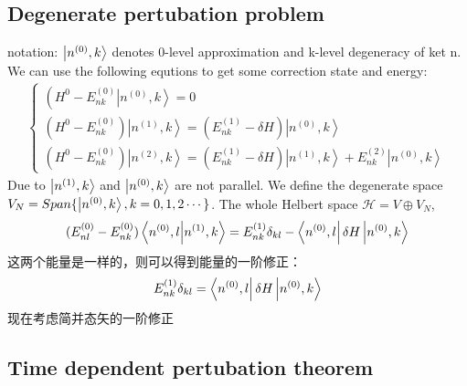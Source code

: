 \documentclass[UTF8]{article}
\numberwithin{equation}{section}
\begin{document}
\subsection{Degenerate pertubation problem}
notation: $\ket{n^{(0)},k}$ denotes 0-level approximation and k-level degeneracy of ket n.
We can use the following equtions to get some correction state and energy:
\begin{align*}
    \left\{\begin{array}{l}
    \left(H^0-E_{n k}^{(0)}\left|n^{(0)}, k\right\rangle=0 \right. \\
    \left(H^0-E_{n k}^{(0)}\right)\left|n^{(1)}, k\right\rangle=\left(E_{n k}^{(1)}-\delta H\right)\left|n^{(0)}, k\right\rangle \\
    \left(H^0-E_{n k}^{(0)}\right)\left|n^{(2)}, k\right\rangle=\left(E_{n k}^{(1)}-\delta H\right)\left|n^{(1)}, k\right\rangle+E_{n k}^{(2)}\left|n^{(0)}, k\right\rangle
    \end{array}\right.
\end{align*}
Due to $\ket{n^{(1)},k}$ and $\ket{n^{(0)},k}$ are not parallel. We define
the degenerate space $V_N = Span\{\ket{n^{(0)},k},k=0,1,2\cdots\}$. The
whole Helbert space $\mathcal{H} =V \oplus V_N$,
\begin{align*}
    (E_{nl}^{(0)}-E_{nk}^{(0)})\braket{n^{(0)},l}{n^{(1)},k} = E_{nk}^{(1)}
    \delta _{kl}-\bra{n^{(0)},l}\delta H \ket{n^{(0)},k}
\end{align*}
这两个能量是一样的，则可以得到能量的一阶修正：
\begin{align*}
    E_{nk}^{(1)}\delta_{kl} = \bra{n^{(0)},l}\delta H\ket{n^{(0)},k}
\end{align*}
现在考虑简并态矢的一阶修正

\subsection{Time dependent pertubation theorem} 
\end{document}

